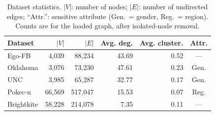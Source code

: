 \begin{table}[t]
\caption{Dataset statistics. $|V|$: number of nodes; $|E|$: number of undirected edges; ``Attr.'': sensitive attribute (Gen.\ = gender, Reg.\ = region). Counts are for the loaded graph, after isolated-node removal.}
\label{tab:datasets}
\centering
\small
\begin{tabular}{lrrrrc}
\toprule
Dataset & $|V|$ & $|E|$ & Avg. deg. & Avg. cluster. & Attr. \\
\midrule
Ego-FB & 4,039 & 88,234 & 43.69 & 0.52 & --- \\
Oklahoma & 3,076 & 73,230 & 47.61 & 0.23 & Gen. \\
UNC & 3,985 & 65,287 & 32.77 & 0.17 & Gen. \\
Pokec-n & 66,569 & 517,047 & 15.53 & 0.07 & Reg. \\
Brightkite & 58,228 & 214,078 & 7.35 & 0.11 & --- \\
\bottomrule
\end{tabular}
\end{table}
